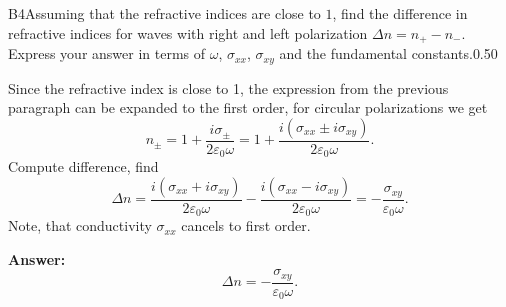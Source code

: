 \documentclass[11pt,a4paper]{article}
\begin{document}
\begin{solcard}{B4}{Assuming that the refractive indices are close to $1$, find the difference in refractive indices for waves with right and left polarization $\Delta n = n_{+} - n_{-}$. Express your answer in terms of $\omega$, $\sigma_{xx}$, $\sigma_{xy}$ and the fundamental constants.}{0.50}

Since the refractive index is close to 1, the expression from the previous paragraph can be expanded to the first order, for circular polarizations we get $$ n_{\pm} = 1 + \frac{i \sigma_{\pm}}{2 \varepsilon_0 \omega} = 1 + \frac{i (\sigma_{xx} \pm i \sigma_{xy})}{2 \varepsilon_0 \omega}. $$Compute difference, find $$\Delta n  = \frac{i (\sigma_{xx} + i \sigma_{xy})}{2 \varepsilon_0 \omega} - \frac{i (\sigma_{xx} - i \sigma_{xy})}{2 \varepsilon_0 \omega} = - \frac{\sigma_{xy}}{\varepsilon_0 \omega}.$$Note, that conductivity $\sigma_{xx}$ cancels to first order.

\par\smallskip\noindent\textbf{Answer:} $$ \Delta n = - \frac{\sigma_{xy}}{\varepsilon_0 \omega}. $$
\end{solcard}
\end{document}
